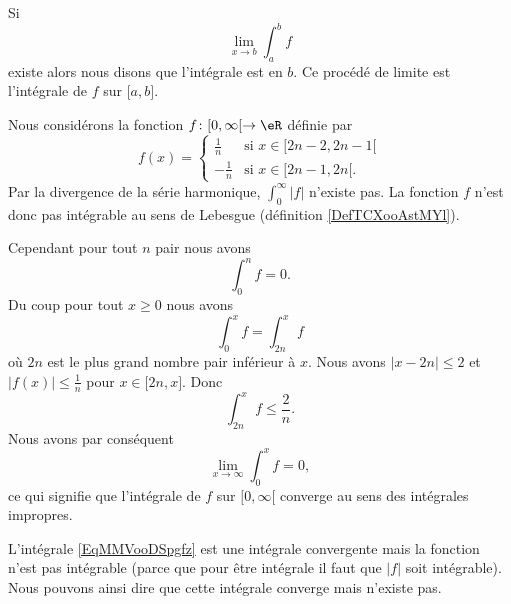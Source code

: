 \begin{definition}      \label{DEFooINPOooWWObEz}
    Si
    \begin{equation}
        \lim_{x\to b} \int_a^bf
    \end{equation}
    existe alors nous disons que l'intégrale est  en \( b\). Ce procédé de limite est l'intégrale  de \( f\) sur \( \mathopen[ a , b \mathclose]\).
\end{definition}

\begin{example}
    Nous considérons la fonction \( f\colon \mathopen[ 0 , \infty [\to \eR\) définie par
    \begin{equation}
        f(x)=\begin{cases}
            \frac{1}{ n }    &   \text{si } x\in\mathopen[ 2n-2 , 2n-1 [\\
                -\frac{1}{ n }    &    \text{si } x\in\mathopen[ 2n-1 , 2n [\text{.}
        \end{cases}
    \end{equation}
    Par la divergence de la série harmonique, \( \int_{0}^{\infty}| f |\) n'existe pas. La fonction \( f\) n'est donc pas intégrable au sens de Lebesgue (définition \ref{DefTCXooAstMYl}).

    Cependant pour tout \( n\) pair nous avons
    \begin{equation}
        \int_0^nf=0.
    \end{equation}
    Du coup pour tout \( x\geq 0\) nous avons
    \begin{equation}
        \int_0^xf=\int_{2n}^xf
    \end{equation}
    où \( 2n\) est le plus grand nombre pair inférieur à \( x\). Nous avons \( | x-2n |\leq 2\) et \( | f(x) |\leq \frac{1}{ n }\) pour \( x\in\mathopen[ 2n , x \mathclose]\). Donc
    \begin{equation}
        \int_{2n}^xf\leq \frac{ 2 }{ n }.
    \end{equation}
    Nous avons par conséquent
    \begin{equation}
        \lim_{x\to \infty} \int_0^xf=0,
    \end{equation}
    ce qui signifie que l'intégrale de \( f\) sur \( \mathopen[ 0 , \infty [\) converge au sens des intégrales impropres.
\end{example}


L'intégrale \eqref{EqMMVooDSpgfz} est une intégrale convergente mais la fonction n'est pas intégrable (parce que pour être intégrale il faut que \( | f |\) soit intégrable). Nous pouvons ainsi dire que cette intégrale converge mais n'existe pas.

